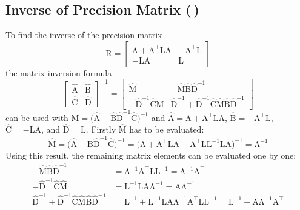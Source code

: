 \documentclass[11pt, a4paper]{scrartcl}
\newcommand{\transposed}{{\!\top\!}}
\newcommand{\mat}[1]{\bm{\mathrm{#1}}}
\newcommand{\diffstar}{\texorpdfstring{\raisebox{-1pt}{\resizebox{!}{8pt}{\(\star\)}}}{*}}
\newcommand{\twostar}  {(\diffstar\,\diffstar)}
\begin{document}
		\subsection{Inverse of Precision Matrix  \twostar}
			To find the inverse of the precision matrix
			\begin{equation}
				\mat{R} =
					\begin{bmatrix}
						\mat{\Lambda} + \mat{A}^\transposed \mat{L} \mat{A} & -\mat{A}^\transposed \mat{L} \\
						-\mat{L} \mat{A}                                    & \mat{L}
					\end{bmatrix}
			\end{equation}
			the matrix inversion formula
			\begin{equation}
				\begin{bmatrix}
					\hat{\mat{A}} & \hat{\mat{B}} \\
					\hat{\mat{C}} & \hat{\mat{D}}
				\end{bmatrix}^{-1}
				=
				\begin{bmatrix}
					\hat{\mat{M}} & -\hat{\mat{M}} \hat{\mat{B}} \hat{\mat{D}}^{-1} \\
					-\hat{\mat{D}}^{-1} \hat{\mat{C}} \hat{\mat{M}} & \hat{\mat{D}}^{-1} + \hat{\mat{D}}^{-1} \hat{\mat{C}} \hat{\mat{M}} \hat{\mat{B}} \hat{\mat{D}}^{-1}
				\end{bmatrix}
			\end{equation}
			can be used with \( \hat{\mat{M}} = \big( \hat{\mat{A}} - \hat{\mat{B}} \hat{\mat{D}}^{-1} \hat{\mat{C}} \big)^{-1} \) and \( \hat{\mat{A}} = \mat{\Lambda} + \mat{A}^\transposed \mat{L} \mat{A} \), \( \hat{\mat{B}} = -\mat{A}^\transposed \mat{L} \), \( \hat{\mat{C}} = -\mat{L} \mat{A} \), and \( \hat{\mat{D}} = \mat{L} \). Firstly \( \hat{\mat{M}} \) has to be evaluated:
			\begin{equation}
				\hat{\mat{M}}
					= \big( \hat{\mat{A}} - \hat{\mat{B}} \hat{\mat{D}}^{-1} \hat{\mat{C}} \big)^{-1}
					= \big( \mat{\Lambda} + \mat{A}^\transposed \mat{L} \mat{A} - \mat{A}^\transposed \mat{L} \mat{L}^{-1} \mat{L} \mat{A} \big)^{-1}
					= \mat{\Lambda}^{-1}
			\end{equation}
			Using this result, the remaining matrix elements can be evaluated one by one:
			\begin{align}
				-\hat{\mat{M}} \hat{\mat{B}} \hat{\mat{D}}^{-1}
					&= \mat{\Lambda}^{-1} \mat{A}^\transposed \mat{L} \mat{L}^{-1}
					 = \mat{\Lambda}^{-1} \mat{A}^\transposed \\
				-\hat{\mat{D}}^{-1} \hat{\mat{C}} \hat{\mat{M}}
					&= \mat{L}^{-1} \mat{L} \mat{A} \mat{\Lambda}^{-1}
					 = \mat{A} \mat{\Lambda}^{-1} \\
				\hat{\mat{D}}^{-1} + \hat{\mat{D}}^{-1} \hat{\mat{C}} \hat{\mat{M}} \hat{\mat{B}} \hat{\mat{D}}^{-1}
					&= \mat{L}^{-1} + \mat{L}^{-1} \mat{L} \mat{A} \mat{\Lambda}^{-1} \mat{A}^\transposed \mat{L} \mat{L}^{-1}
					 = \mat{L}^{-1} + \mat{A} \mat{\Lambda}^{-1} \mat{A}^\transposed
			\end{align}
\end{document}
